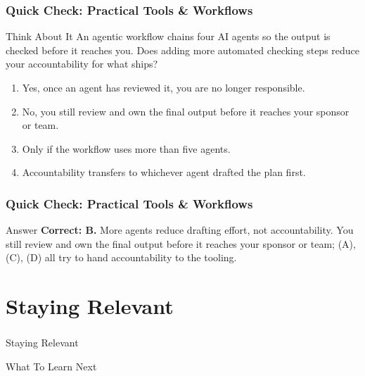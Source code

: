 \begin{frame}[fragile]\frametitle{Quick Check: Practical Tools \& Workflows}
\begin{block}{Think About It}
An agentic workflow chains four AI agents so the output is checked before it reaches you. Does adding more automated checking steps reduce your accountability for what ships?
\begin{enumerate}
  \item[A.] Yes, once an agent has reviewed it, you are no longer responsible.
  \item[B.] No, you still review and own the final output before it reaches your sponsor or team.
  \item[C.] Only if the workflow uses more than five agents.
  \item[D.] Accountability transfers to whichever agent drafted the plan first.
\end{enumerate}
\end{block}
\end{frame}

\begin{frame}[fragile]\frametitle{Quick Check: Practical Tools \& Workflows}
\begin{block}{Answer}
\textbf{Correct: B.} More agents reduce drafting effort, not accountability. You still review and own the final output before it reaches your sponsor or team; (A), (C), (D) all try to hand accountability to the tooling.
\end{block}
\end{frame}

\section[Learn]{Staying Relevant}
\begin{frame}[fragile]\frametitle{}
\begin{center}
{\Large Staying Relevant}

{\small What To Learn Next}
\end{center}
\end{frame}

